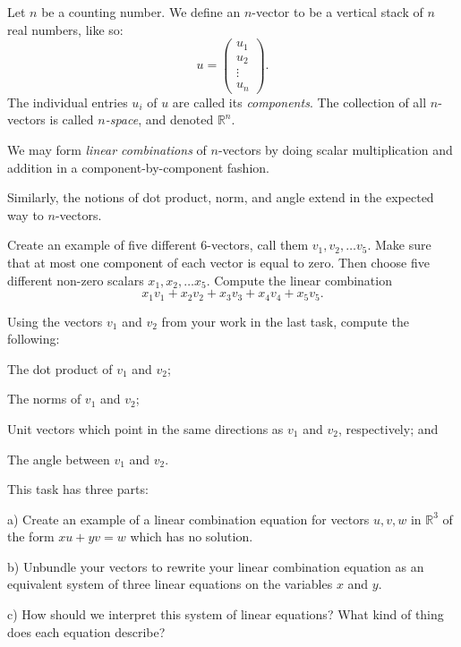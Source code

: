 \documentclass[cahier-main.tex]{subfiles}
\begin{document}
\begin{definition}
Let $n$ be a counting number. We define an $n$-vector to be a vertical stack of $n$ real numbers, like so:
\[
u = \begin{pmatrix} u_1 \\ u_2 \\ \vdots \\ u_n \end{pmatrix} .
\]
The individual entries $u_i$ of $u$ are called its \emph{components}.
The collection of all $n$-vectors is called \emph{$n$-space}, and denoted $\mathbb{R}^n$.

We may form \emph{linear combinations} of $n$-vectors by doing scalar multiplication and addition in a component-by-component fashion.

Similarly, the notions of dot product, norm, and angle extend in the expected way to $n$-vectors.
\end{definition}

\begin{task}
Create an example of five different $6$-vectors, call them $v_1, v_2, \ldots v_5$. Make sure that at most one component of each vector is equal to zero. Then choose five different non-zero scalars $x_1, x_2, \ldots x_5$. Compute the linear combination
\[
x_1 v_1 + x_2 v_2 + x_3 v_3 + x_4 v_4 + x_5 v_5.
\]
\end{task}

\begin{task}
Using the vectors $v_1$ and $v_2$ from your work in the last task, compute the following:
\begin{compactitem}
\item The dot product of $v_1$ and $v_2$;
\item The norms of $v_1$ and $v_2$;
\item Unit vectors which point in the same directions as $v_1$ and $v_2$, respectively; and
\item The angle between $v_1$ and $v_2$.
\end{compactitem}
\end{task}


\begin{task} This task has three parts:
\begin{compactitem}
\item[a)] Create an example of a linear combination equation for vectors $u, v, w$ in $\mathbb{R}^3$ of the form $x u + y v = w$ which has no solution.
\item[b)] Unbundle your vectors to rewrite your linear combination equation as an equivalent system of three linear equations on the variables $x$ and $y$.
\item[c)] How should we interpret this system of linear equations? What kind of thing does each equation describe?
\end{compactitem}
\end{task}
\end{document}
